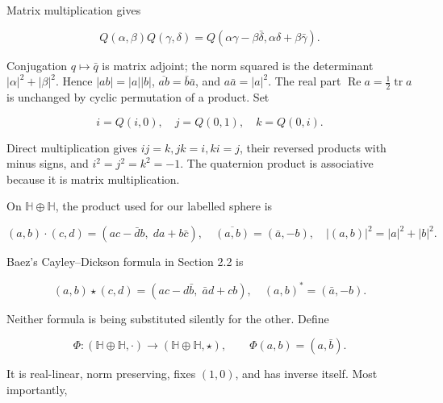 Matrix multiplication gives

\begin{equation}
Q(\alpha,\beta)Q(\gamma,\delta)
=Q(\alpha\gamma-\beta\bar\delta,
\alpha\delta+\beta\bar\gamma).
\label{courseIII:almost-complex-structures-and-integrability:eq:2.2}
\end{equation}

Conjugation \(q\mapsto\bar q\) is matrix adjoint; the norm squared is the determinant \(|\alpha|^2+|\beta|^2\). Hence \(|ab|=|a||b|\), \(\overline{ab}=\bar b\bar a\), and \(a\bar a=|a|^2\). The real part \(\operatorname{Re}a=\frac12\operatorname{tr}a\) is unchanged by cyclic permutation of a product. Set

\begin{equation}
i=Q(i,0),\quad j=Q(0,1),\quad k=Q(0,i).
\label{courseIII:almost-complex-structures-and-integrability:eq:2.3}
\end{equation}

Direct multiplication gives \(ij=k,jk=i,ki=j\), their reversed products with minus signs, and \(i^2=j^2=k^2=-1\). The quaternion product is associative because it is matrix multiplication.

On \(\mathbb H\oplus\mathbb H\), the product used for our labelled sphere is

\begin{equation}
(a,b)\cdot(c,d)=(ac-\bar d b,\;da+b\bar c),
\quad \overline{(a,b)}=(\bar a,-b),
\quad |(a,b)|^2=|a|^2+|b|^2.
\label{courseIII:almost-complex-structures-and-integrability:eq:2.4}
\end{equation}

Baez's Cayley--Dickson formula in Section 2.2 is

\begin{equation}
(a,b)\star(c,d)=(ac-d\bar b,\;\bar a d+cb),
\quad (a,b)^*=(\bar a,-b).
\label{courseIII:almost-complex-structures-and-integrability:eq:2.5}
\end{equation}

Neither formula is being substituted silently for the other. Define

\begin{equation}
\Phi:(\mathbb H\oplus\mathbb H,\cdot)
\longrightarrow(\mathbb H\oplus\mathbb H,\star),
\qquad \Phi(a,b)=(a,\bar b).
\label{courseIII:almost-complex-structures-and-integrability:eq:2.6}
\end{equation}

It is real-linear, norm preserving, fixes \((1,0)\), and has inverse itself. Most importantly,


